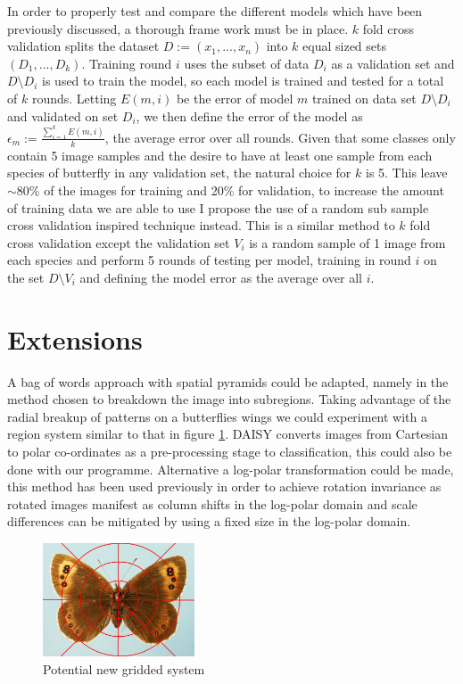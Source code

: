 \documentclass[11pt, titlepage, oneside]{article}
\theoremstyle{plain}
\theoremstyle{definition}
\theoremstyle{remark}
\begin{document}
			\noindent In order to properly test and compare the different models which have been previously discussed, a thorough frame work must be in place. $k$ fold cross validation splits the dataset $D:=(x_1,...,x_n)$ into $k$ equal sized sets $(D_1,...,D_k)$. Training round $i$ uses the subset of data $D_i$ as a validation set and $D\setminus D_i$ is used to train the model, so each model is trained and tested for a total of $k$ rounds. Letting $E(m,i)$ be the error of model $m$ trained on data set $D\setminus D_i$ and validated on set $D_i$, we then define the error of the model as $\epsilon_m := \frac{\sum_{i=1}^{k} E(m,i)}{k}$, the average error over all rounds. Given that some classes only contain 5 image samples and the desire to have at least one sample from each species of butterfly in any validation set, the natural choice for $k$ is 5. This leave $\sim$80\% of the images for training and 20\% for validation, to increase the amount of training data we are able to use I propose the use of a random sub sample cross validation inspired technique instead. This is a similar method to $k$ fold cross validation except the validation set $V_i$ is a random sample of 1 image from each species and perform 5 rounds of testing per model, training in round $i$ on the set $D\setminus V_i$ and defining the model error as the average over all $i$.

	
	\newpage
	\section{Extensions}
		A bag of words approach with spatial pyramids could be adapted, namely in the method chosen to breakdown the image into subregions. Taking advantage of the radial breakup of patterns\cite{butterfly} on a butterflies wings we could experiment with a region system similar to that in figure \ref{fig:radial}. DAISY converts images from Cartesian to polar co-ordinates\cite{DAISY} as a pre-processing stage to classification, this could also be done with our programme. Alternative a log-polar transformation could be made, this method has been used previously\cite{logpolar} in order to achieve rotation invariance as rotated images manifest as column shifts in the log-polar domain and scale differences can be mitigated by using a fixed size in the log-polar domain.
		\begin{figure}[H]
			\centering
				\includegraphics[width=0.4\textwidth]{Erebia-aethiops-08-radial.jpg} 
			\caption{Potential new gridded system}
			\label{fig:radial}
		\end{figure}
\end{document}
